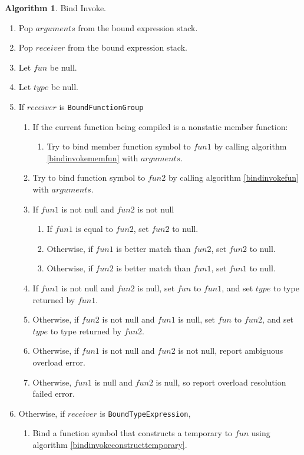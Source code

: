 \documentclass[a4paper,oneside,11pt]{book}
\theoremstyle{definition}
\newtheorem{algo}{Algorithm}[section]
\begin{document}
\begin{algo}\label{bindinvoke} Bind Invoke.
\begin{enumerate}
\item
Pop $arguments$ from the bound expression stack.
\item
Pop $receiver$ from the bound expression stack.
\item
Let $fun$ be null.
\item
Let $type$ be null.
\item
If $receiver$ is \verb|BoundFunctionGroup|
\begin{enumerate}
\item
If the current function being compiled is a nonstatic member function:
\begin{enumerate}
\item
Try to bind member function symbol to $fun1$ by calling algorithm \ref{bindinvokememfun} with $arguments$.
\end{enumerate}
\item
Try to bind function symbol to $fun2$ by calling algorithm \ref{bindinvokefun} with $arguments$.
\item
If $fun1$ is not null and $fun2$ is not null
\begin{enumerate}
\item
If $fun1$ is equal to $fun2$, set $fun2$ to null.
\item
Otherwise, if $fun1$ is better match than $fun2$, set $fun2$ to null.
\item
Otherwise, if $fun2$ is better match than $fun1$, set $fun1$ to null.
\end{enumerate}
\item
If $fun1$ is not null and $fun2$ is null, set $fun$ to $fun1$, and set $type$ to type returned by $fun1$.
\item
Otherwise, if $fun2$ is not null and $fun1$ is null, set $fun$ to $fun2$, and set $type$ to type returned by $fun2$.
\item
Otherwise, if $fun1$ is not null and $fun2$ is not null, report ambiguous overload error.
\item
Otherwise, $fun1$ is null and $fun2$ is null, so report overload resolution failed error.
\end{enumerate}
\item
Otherwise, if $receiver$ is \verb|BoundTypeExpression|,
\begin{enumerate}
\item
Bind a function symbol that constructs a temporary to $fun$ using algorithm \ref{bindinvokeconstructtemporary}.

\end{enumerate}
\end{enumerate}
\end{algo}
\end{document}
